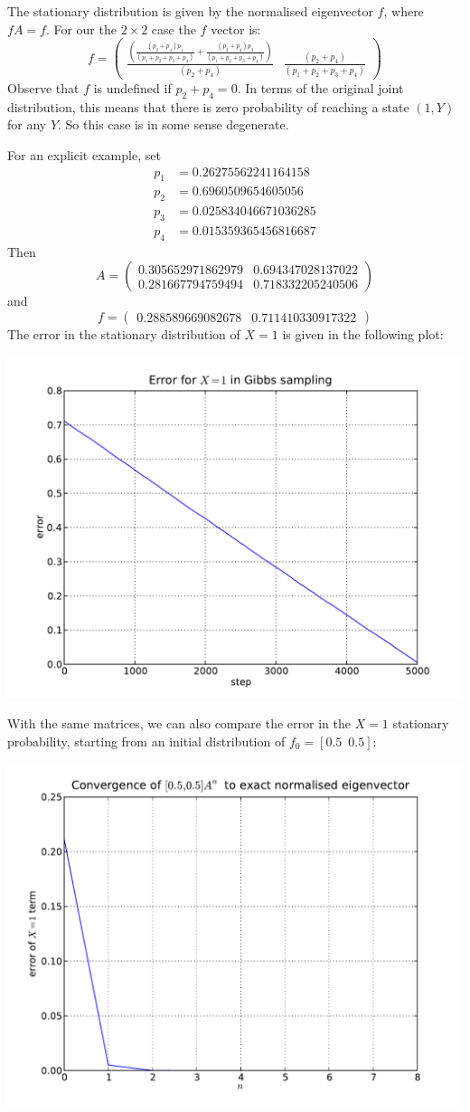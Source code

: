 \documentclass[12pt,amstags,fleqn]{article}
\theoremstyle{plain}
\theoremstyle{definition}
\theoremstyle{definition}
\begin{document}
The stationary distribution is given by the normalised eigenvector $f$,
where $fA = f$. For our the $2 \times 2$ case the $f$ vector is:
\[
f = 
\left(\begin{array}{rr}
\frac{{(\frac{{(p_{2} + p_{4})} p_{1}}{{(p_{1} + p_{2} + p_{3} +
p_{4})}} + \frac{{(p_{2} + p_{4})} p_{3}}{{(p_{1} + p_{2} + p_{3} +
p_{4})}})}}{{(p_{2} + p_{4})}} & \frac{{(p_{2} + p_{4})}}{{(p_{1} +
p_{2} + p_{3} + p_{4})}}
\end{array}\right)
\]
Observe that $f$ is undefined if $p_2 + p_4 = 0$. In terms of the
original joint distribution, this means that there is zero probability
of reaching a state $(1, Y)$ for any $Y$. So this case is in some sense
degenerate.

For an explicit example, set
\begin{align*}
p_1 &= 0.26275562241164158 \\
p_2 &= 0.6960509654605056 \\
p_3 &= 0.025834046671036285 \\
p_4 &= 0.015359365456816687
\end{align*}
Then 
\[
A = \left(\begin{array}{rr}
0.305652971862979 & 0.694347028137022 \\
0.281667794759494 & 0.718332205240506
\end{array}\right)
\]
and
\[
f = \left(\begin{array}{rr}
0.288589669082678 & 0.711410330917322
\end{array}\right)
\]
The error in the stationary distribution of $X=1$ is given in the
following plot:
\begin{center}
\includegraphics[width=.75\textwidth]{gibbs_2x2_error.pdf}
\end{center}
With the same matrices, we can also compare the error in the $X=1$
stationary probability, starting from an initial distribution of $f_0 =
[0.5 \,\,\, 0.5]$: 
\begin{center}
\includegraphics[width=.75\textwidth]{gibbs_error_matrix_mult.pdf}
\end{center}



\end{document}
